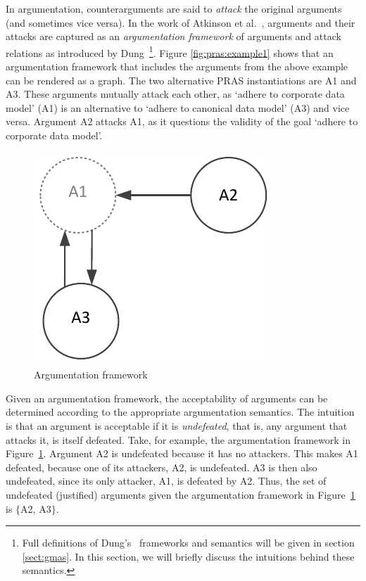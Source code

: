 In argumentation, counterarguments are said to \emph{attack} the original arguments (and sometimes vice versa). In the work of Atkinson et al.~\cite{atkinson2007}, arguments and their attacks are captured as an \emph{argumentation framework} of arguments and attack relations as introduced by Dung~\cite{Dung1995}\footnote{Full definitions of Dung's~\cite{Dung1995} frameworks and semantics will be given in section \ref{sect:gmas}. In this section, we will briefly discuss the intuitions behind these semantics.}. Figure \ref{fig:pras:example1} shows that an argumentation framework that includes the arguments from the above example can be rendered as a graph. The two alternative PRAS instantiations are A1 and A3. These arguments mutually attack each other, as `adhere to corporate data model' (A1) is an alternative to `adhere to canonical data model' (A3) and vice versa. Argument A2 attacks A1, as it questions the validity of the goal `adhere to corporate data model'. 

\begin{figure}[ht]
\centering
\includegraphics[width=\columnwidth]{img/Fig1}
\caption{Argumentation framework}
\label{fig:pras:example}
\end{figure}

Given an argumentation framework, the acceptability of arguments can be determined according to the appropriate argumentation semantics. The intuition is that an argument is acceptable if it is \emph{undefeated}, that is, any argument that attacks it, is itself defeated. Take, for example, the argumentation framework in Figure~\ref{fig:pras:example}. Argument A2 is undefeated because it has no attackers. This makes A1 defeated, because one of its attackers, A2, is undefeated. A3 is then also undefeated, since its only attacker, A1, is defeated by A2. Thus, the set of undefeated (justified) arguments given the argumentation framework in Figure~\ref{fig:pras:example} is $\{$A2, A3$\}$. 

